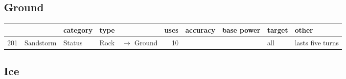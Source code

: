 \documentclass{article}
\begin{document}
\begin{landscape}
\normalsize
\subsection{Ground}
\small
\begin{longtable}{rl|l|ll|rrr|l|l}
 &  & category & type &  & uses & accuracy & base power & target & other \\
\hline
201 & Sandstorm & Status & Rock & $\rightarrow$ Ground & 10 &  &  & all & lasts five turns \\
\end{longtable}

\normalsize
\subsection{Ice}

\normalsize

\end{landscape}
\end{document}

